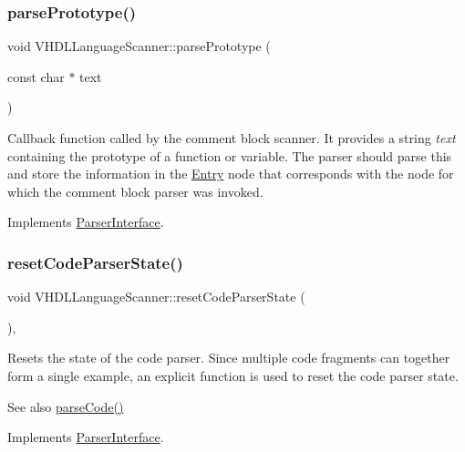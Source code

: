 \subsubsection{\texorpdfstring{parsePrototype()}{parsePrototype()}}
{\footnotesize\ttfamily void V\+H\+D\+L\+Language\+Scanner\+::parse\+Prototype (\begin{DoxyParamCaption}\item[{const char $\ast$}]{text }\end{DoxyParamCaption})\hspace{0.3cm}{\ttfamily [virtual]}}

Callback function called by the comment block scanner. It provides a string {\itshape text} containing the prototype of a function or variable. The parser should parse this and store the information in the \mbox{\hyperlink{class_entry}{Entry}} node that corresponds with the node for which the comment block parser was invoked. 

Implements \mbox{\hyperlink{class_parser_interface_a5ebf0f524a296845befa22c85a4cc80b}{Parser\+Interface}}.

\mbox{\label{class_v_h_d_l_language_scanner_a67461c7de314e7f414fb70d5735727c3}} 
\subsubsection{\texorpdfstring{resetCodeParserState()}{resetCodeParserState()}}
{\footnotesize\ttfamily void V\+H\+D\+L\+Language\+Scanner\+::reset\+Code\+Parser\+State (\begin{DoxyParamCaption}{ }\end{DoxyParamCaption})\hspace{0.3cm}{\ttfamily [inline]}, {\ttfamily [virtual]}}

Resets the state of the code parser. Since multiple code fragments can together form a single example, an explicit function is used to reset the code parser state. \begin{DoxySeeAlso}{See also}
\mbox{\hyperlink{class_v_h_d_l_language_scanner_a50e725c43fa209d4caad04c214bbb1f2}{parse\+Code()}} 
\end{DoxySeeAlso}


Implements \mbox{\hyperlink{class_parser_interface_aee4fccd1865a4e8a6b9f2896811104ca}{Parser\+Interface}}.

